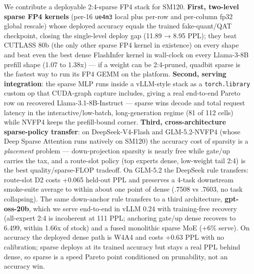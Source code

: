 \documentclass[
]{article}
\begin{document}
We contribute a deployable 2:4-sparse FP4 stack for SM120.
\textbf{First, two-level sparse FP4 kernels} (per-16 \texttt{ue4m3}
local plus per-row and per-column fp32 global rescale) whose deployed
accuracy equals the trained fake-quant/QAT checkpoint, closing the
single-level deploy gap (11.89 → 8.95 PPL); they beat CUTLASS 80b (the
only other sparse FP4 kernel in existence) on every shape and beat even
the best dense FlashInfer kernel in wall-clock on every Llama-3-8B
prefill shape (1.07 to 1.38x) --- if a weight can be 2:4-pruned, quadbit
sparse is the fastest way to run its FP4 GEMM on the platform.
\textbf{Second, serving integration}: the sparse MLP runs inside a
vLLM-style stack as a \texttt{torch.library} custom op that CUDA-graph
capture includes, giving a real end-to-end Pareto row on recovered
Llama-3.1-8B-Instruct --- sparse wins decode and total request latency
in the interactive/low-batch, long-generation regime (81 of 112 cells)
while NVFP4 keeps the prefill-bound corner. \textbf{Third,
cross-architecture sparse-policy transfer}: on DeepSeek-V4-Flash and
GLM-5.2-NVFP4 (whose Deep Sparse Attention runs natively on SM120) the
accuracy cost of sparsity is a \emph{placement} problem ---
down-projection sparsity is nearly free while gate/up carries the tax,
and a route-slot policy (top experts dense, low-weight tail 2:4) is the
best quality/sparse-FLOP tradeoff. On GLM-5.2 the DeepSeek rule
transfers: route-slot D2 costs +0.065 held-out PPL and preserves a
4-task downstream smoke-suite average to within about one point of dense
(.7508 vs .7603, no task collapsing). The same down-anchor rule
transfers to a third architecture, \textbf{gpt-oss-20b}, which we serve
end-to-end in vLLM 0.24 with training-free recovery (all-expert 2:4 is
incoherent at 111 PPL; anchoring gate/up dense recovers to 6.499, within
1.66x of stock) and a fused monolithic sparse MoE (+6\% serve). On
accuracy the deployed dense path is W4A4 and costs +0.63 PPL with no
calibration; sparse deploys at its trained accuracy but stays a real PPL
behind dense, so sparse is a speed Pareto point conditioned on
prunability, not an accuracy win.
\end{document}

